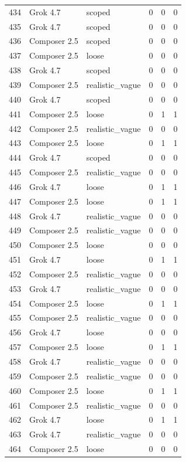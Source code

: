 \begin{tabular}{llllll}
434 & Grok 4.7 & scoped & 0 & 0 & 0 \\
435 & Grok 4.7 & scoped & 0 & 0 & 0 \\
436 & Composer 2.5 & scoped & 0 & 0 & 0 \\
437 & Composer 2.5 & loose & 0 & 0 & 0 \\
438 & Grok 4.7 & scoped & 0 & 0 & 0 \\
439 & Composer 2.5 & realistic\_vague & 0 & 0 & 0 \\
440 & Grok 4.7 & scoped & 0 & 0 & 0 \\
441 & Composer 2.5 & loose & 0 & 1 & 1 \\
442 & Composer 2.5 & realistic\_vague & 0 & 0 & 0 \\
443 & Composer 2.5 & loose & 0 & 1 & 1 \\
444 & Grok 4.7 & scoped & 0 & 0 & 0 \\
445 & Composer 2.5 & realistic\_vague & 0 & 0 & 0 \\
446 & Grok 4.7 & loose & 0 & 1 & 1 \\
447 & Composer 2.5 & loose & 0 & 1 & 1 \\
448 & Grok 4.7 & realistic\_vague & 0 & 0 & 0 \\
449 & Composer 2.5 & realistic\_vague & 0 & 0 & 0 \\
450 & Composer 2.5 & loose & 0 & 0 & 0 \\
451 & Grok 4.7 & loose & 0 & 1 & 1 \\
452 & Composer 2.5 & realistic\_vague & 0 & 0 & 0 \\
453 & Grok 4.7 & realistic\_vague & 0 & 0 & 0 \\
454 & Composer 2.5 & loose & 0 & 1 & 1 \\
455 & Composer 2.5 & realistic\_vague & 0 & 0 & 0 \\
456 & Grok 4.7 & loose & 0 & 0 & 0 \\
457 & Composer 2.5 & loose & 0 & 1 & 1 \\
458 & Grok 4.7 & realistic\_vague & 0 & 0 & 0 \\
459 & Composer 2.5 & realistic\_vague & 0 & 0 & 0 \\
460 & Composer 2.5 & loose & 0 & 1 & 1 \\
461 & Composer 2.5 & realistic\_vague & 0 & 0 & 0 \\
462 & Grok 4.7 & loose & 0 & 1 & 1 \\
463 & Grok 4.7 & realistic\_vague & 0 & 0 & 0 \\
464 & Composer 2.5 & loose & 0 & 0 & 0 \\

\end{tabular}
